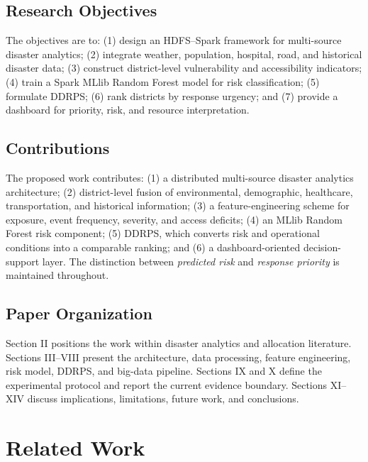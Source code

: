 \documentclass[conference]{IEEEtran}
\begin{document}
\subsection{Research Objectives}
The objectives are to: (1) design an HDFS--Spark framework for multi-source
disaster analytics; (2) integrate weather, population, hospital, road, and
historical disaster data; (3) construct district-level vulnerability and
accessibility indicators; (4) train a Spark MLlib Random Forest model for risk
classification; (5) formulate DDRPS; (6) rank districts by response urgency;
and (7) provide a dashboard for priority, risk, and resource interpretation.

\subsection{Contributions}
The proposed work contributes: (1) a distributed multi-source disaster
analytics architecture; (2) district-level fusion of environmental,
demographic, healthcare, transportation, and historical information; (3) a
feature-engineering scheme for exposure, event frequency, severity, and access
deficits; (4) an MLlib Random Forest risk component; (5) DDRPS, which converts
risk and operational conditions into a comparable ranking; and (6) a
dashboard-oriented decision-support layer. The distinction between
\emph{predicted risk} and \emph{response priority} is maintained throughout.

\subsection{Paper Organization}
Section II positions the work within disaster analytics and allocation
literature. Sections III--VIII present the architecture, data processing,
feature engineering, risk model, DDRPS, and big-data pipeline. Sections IX and
X define the experimental protocol and report the current evidence boundary.
Sections XI--XIV discuss implications, limitations, future work, and
conclusions.

\section{Related Work}
\end{document}
